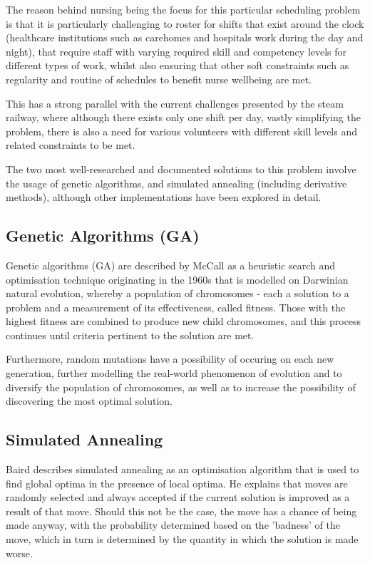 The reason behind nursing being the focus for this particular scheduling problem is that it is particularly challenging to roster for shifts that exist around the clock (healthcare institutions such as carehomes and hospitals work during the day and night), that require staff with varying required skill and competency levels for different types of work, whilst also ensuring that other soft constraints such as regularity and routine of schedules to benefit nurse wellbeing are met. \cite{Burke2004}

This has a strong parallel with the current challenges presented by the steam railway, where although there exists only one shift per day, vastly simplifying the problem, there is also a need for various volunteers with different skill levels and related constraints to be met.

The two most well-researched and documented solutions to this problem involve the usage of genetic algorithms, and simulated annealing (including derivative methods), although other implementations have been explored in detail.


\subsection{Genetic Algorithms (GA)}
Genetic algorithms (GA) are described by McCall as a heuristic search and optimisation technique originating in the 1960s that is modelled on Darwinian natural evolution, whereby a population of chromosomes - each a solution to a problem and a measurement of its effectiveness, called fitness. Those with the highest fitness are combined to produce new child chromosomes, and this process continues until criteria pertinent to the solution are met. \cite{MCCALL2005205}

Furthermore, random mutations have a possibility of occuring on each new generation, further modelling the real-world phenomenon of evolution and to diversify the population of chromosomes, as well as to increase the possibility of discovering the most optimal solution. \cite{AUGUSTINE2009}


\subsection{Simulated Annealing}
Baird describes simulated annealing as an optimisation algorithm that is used to find global optima in the presence of local optima. He explains that moves are randomly selected and always accepted if the current solution is improved as a result of that move. Should this not be the case, the move has a chance of being made anyway, with the probability determined based on the 'badness' of the move, which in turn is determined by the quantity in which the solution is made worse. \cite{Baird1998}

